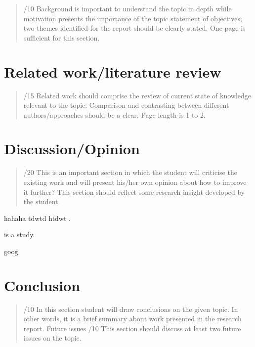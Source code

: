 \documentclass[conference]{IEEEtran}
\begin{document}
\begin{quote}
/10 Background is important to understand the topic in depth while
motivation presents the importance of the topic statement of objectives;
two themes identified for the report should be clearly stated. One page
is sufficient for this section.
\end{quote}

\hypertarget{related-workliterature-review}{%
\section{Related work/literature
review}\label{related-workliterature-review}}

\begin{quote}
/15 Related work should comprise the review of current state of
knowledge relevant to the topic. Comparison and contrasting between
different authors/approaches should be a clear. Page length is 1 to 2.
\end{quote}

\hypertarget{discussionopinion}{%
\section{Discussion/Opinion}\label{discussionopinion}}

\begin{quote}
/20 This is an important section in which the student will criticise the
existing work and will present his/her own opinion about how to improve
it further? This section should reflect some research insight developed
by the student.
\end{quote}

hahaha tdwtd htdwt \autocite{Nobody06}.

\autocite{Nobody06} is a study. \autocite{Ludwig1996}

goog \autocite{Ludwig1996}

\hypertarget{conclusion}{%
\section{Conclusion}\label{conclusion}}

\begin{quote}
/10 In this section student will draw conclusions on the given topic. In
other words, it is a brief summary about work presented in the research
report. Future issues /10 This section should discuss at least two
future issues on the topic.
\end{quote}
\end{document}
